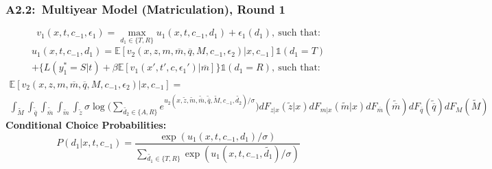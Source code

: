 \documentclass[12pt, aspectratio=169]{beamer}
\begin{document}
\begin{frame}[label=mmmr1]
\frametitle{A2.2:\ Multiyear Model (Matriculation), Round 1}
\footnotesize
\begin{equation*}
v_1(x,t,c_{-1},\epsilon_1) = \max_{d_1\in\{T,R\}}u_1(x,t,c_{-1},d_1)+\epsilon_1(d_1), \: \text{such that:}
\end{equation*}
\begin{multline*}
u_1(x,t,c_{-1},d_1) = \mathbb{E}[v_2(x,z,m,\overline{m},\overline{q},M,c_{-1},\epsilon_2)|x,c_{-1}]\mathds{1}(d_1=T) \\
+\{L(y_1^*=S|t)+\beta\mathbb{E}[v_1(x',t',c,{\epsilon_1}')|\overline{m}]\}\mathds{1}(d_1=R), \: \text{such that:}
\end{multline*}
\begin{multline*}
\mathbb{E}[v_2(x,z,m,\overline{m},\overline{q},M,c_{-1},\epsilon_2)|x,c_{-1}] = \\ \int_{\widetilde M}\int_{\widetilde{\overline{q}}}\int_{\widetilde{\overline{m}}}\int_{\widetilde m}\int_{\widetilde z}\sigma\log\bigg(\sum_{\widetilde{d_2}\in\{A,R\}}e^{u_2(x,\widetilde z,\widetilde m,\widetilde{\overline{m}},\widetilde{\overline{q}},\widetilde M,c_{-1},\widetilde{d_2})/\sigma}\bigg)dF_{z|x}(\widetilde z|x)dF_{m|x}(\widetilde m|x)dF_{\overline m}(\widetilde{\overline{m}})dF_{\overline q}(\widetilde{\overline{q}})dF_M(\widetilde M)
\end{multline*}
\normalsize
\textbf{Conditional Choice Probabilities:}
\footnotesize
\begin{equation*}
P(d_1|x,t,c_{-1}) = \frac{\exp(u_1(x,t,c_{-1},d_1)/\sigma)}{\sum_{\widetilde{d_1}\in\{T,R\}}\exp(u_1(x,t,c_{-1},\widetilde{d_1})/\sigma)}
\end{equation*}
\hyperlink{conc}{}
\end{frame}
\end{document}
